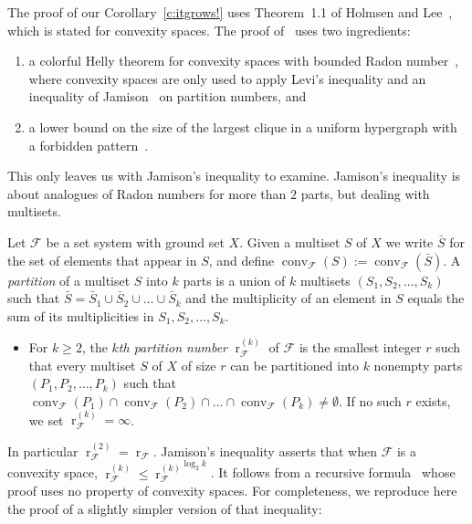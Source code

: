 \documentclass[a4paper,UKenglish,thm-restate]{article}
\newcommand{\F}{\mathcal{F}}
\DeclareMathOperator{\conv}{conv}
\DeclareMathOperator{\rad}{r}
\newcommand{\defn}[1]{\emph{\color{violet}#1}}
\begin{document}
The proof of our Corollary~\ref{c:itgrows!} uses Theorem~1.1 of Holmsen and Lee~\cite{Holmsen2021}, which is stated for convexity spaces. The proof of~\cite[Theorem~1.1]{Holmsen2021} uses two ingredients:

\begin{enumerate}
\item a colorful Helly theorem for convexity spaces with bounded Radon number~\cite[Theorem~2.2]{Holmsen2021}, where convexity spaces are only used to apply Levi's inequality and an inequality of Jamison~\cite[Ineq.~(6)]{jamison1981partition} on partition numbers, and\medskip
  
\item a lower bound on the size of the largest clique in a uniform hypergraph with a forbidden pattern~\cite[Theorem~1.2]{Holmsen2020}.
\end{enumerate}

\noindent
This only leaves us with Jamison's inequality to examine. Jamison's inequality is about analogues of Radon numbers for more than $2$ parts, but dealing with multisets.

\medskip

Let $\F$ be a set system with ground set $X$. Given a multiset $S$ of $X$ we write $\bar S$ for the set of elements that appear in $S$, and define $\conv_\F(S) := \conv_\F(\bar S)$. A \defn{partition} of a multiset $S$ into $k$ parts is a union of $k$ multisets $(S_1, S_2, \ldots, S_k)$ such that $\bar S = \bar S_1 \cup \bar S_2 \cup \ldots \cup \bar S_k$ and the multiplicity of an element in $S$ equals the sum of its multiplicities in $S_1, S_2, \ldots, S_k$. 

\begin{itemize}
\item For $k \ge 2$, the \defn{$k$th partition number} $\rad^{(k)}_\F$ of $\F$ is the smallest integer $r$ such that every multiset $S$ of $X$ of size $r$ can be partitioned into $k$ nonempty parts $(P_1, P_2, \ldots, P_k)$ such that $\conv_{\F}(P_1) \cap \conv_{\F}(P_2) \cap \ldots  \cap \conv_{\F}(P_k)\neq \emptyset$. If no such $r$ exists, we set $\rad_\F^{(k)}=\infty$.
\end{itemize}

\noindent
In particular $\rad^{(2)}_\F = \rad_\F$. Jamison's inequality asserts that when $\F$ is a convexity space, $\rad^{(k)}_\F \le {\rad^{(k)}_\F}^{\log_2 k}$. It follows from a recursive formula~\cite[Theorem~1]{jamison1981partition} whose proof uses no property of convexity spaces. For completeness, we reproduce here the proof of a slightly simpler version of that inequality:
\end{document}
